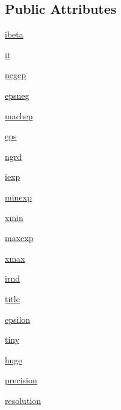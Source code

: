 \subsection*{Public Attributes}
\begin{DoxyCompactItemize}
\item 
\hyperlink{classnumpy_1_1core_1_1machar_1_1MachAr_a573cfbc2ea63ca9f9989f27bfdb1aad3}{ibeta}
\item 
\hyperlink{classnumpy_1_1core_1_1machar_1_1MachAr_ad89387e57a38a49a5a50d72af1e44df5}{it}
\item 
\hyperlink{classnumpy_1_1core_1_1machar_1_1MachAr_a6018256b105f395d98858a2c228fdeed}{negep}
\item 
\hyperlink{classnumpy_1_1core_1_1machar_1_1MachAr_a1422467d25fc0a6eb907b9eada07e93d}{epsneg}
\item 
\hyperlink{classnumpy_1_1core_1_1machar_1_1MachAr_a764631c04360f32d0b5511a657eac464}{machep}
\item 
\hyperlink{classnumpy_1_1core_1_1machar_1_1MachAr_a01c2c9e287faab50bb38078eb0274596}{eps}
\item 
\hyperlink{classnumpy_1_1core_1_1machar_1_1MachAr_ac1e1f0f0b9387d959b58587982f9ecc6}{ngrd}
\item 
\hyperlink{classnumpy_1_1core_1_1machar_1_1MachAr_a0a7cbf81b508618c2c1a4a79ab1c4df7}{iexp}
\item 
\hyperlink{classnumpy_1_1core_1_1machar_1_1MachAr_a4295c497259fa866a138f9a9d9de3f9f}{minexp}
\item 
\hyperlink{classnumpy_1_1core_1_1machar_1_1MachAr_adc11614eec5ddddb6305c32f48d243a4}{xmin}
\item 
\hyperlink{classnumpy_1_1core_1_1machar_1_1MachAr_a650d1f3093b16980ac922239db9c745b}{maxexp}
\item 
\hyperlink{classnumpy_1_1core_1_1machar_1_1MachAr_a0ba1f3cf762856acb37171c7206a21a2}{xmax}
\item 
\hyperlink{classnumpy_1_1core_1_1machar_1_1MachAr_a91e7c393ceeee851f09a80159185b5ac}{irnd}
\item 
\hyperlink{classnumpy_1_1core_1_1machar_1_1MachAr_a16205da5071b2ebbc834e01800dc256c}{title}
\item 
\hyperlink{classnumpy_1_1core_1_1machar_1_1MachAr_a77235e7d990497842ba5ef964f86efd7}{epsilon}
\item 
\hyperlink{classnumpy_1_1core_1_1machar_1_1MachAr_a832cb28124cbf165c9fe9da31383fbf5}{tiny}
\item 
\hyperlink{classnumpy_1_1core_1_1machar_1_1MachAr_a93fe236b4add82203f699273463b1a0e}{huge}
\item 
\hyperlink{classnumpy_1_1core_1_1machar_1_1MachAr_ab0464c5575b2013f0b4176b1e5586dd8}{precision}
\item 
\hyperlink{classnumpy_1_1core_1_1machar_1_1MachAr_aeaa91eb6e9f4ed615a5101fc035e9deb}{resolution}
\end{DoxyCompactItemize}


